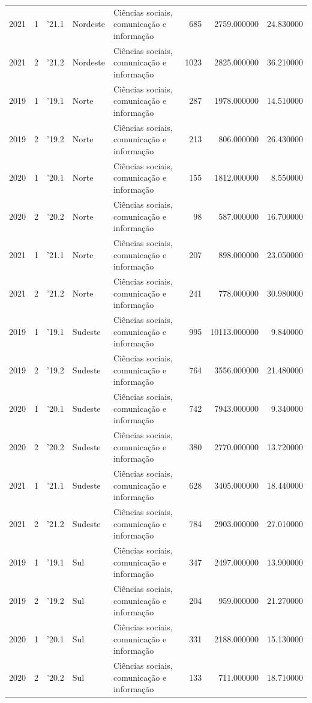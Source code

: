 \begin{longtable}{rrlllrrr}
2021 & 1 & '21.1 & Nordeste & Ciências sociais, comunicação e informação & 685 & 2759.000000 & 24.830000 \\
2021 & 2 & '21.2 & Nordeste & Ciências sociais, comunicação e informação & 1023 & 2825.000000 & 36.210000 \\
2019 & 1 & '19.1 & Norte & Ciências sociais, comunicação e informação & 287 & 1978.000000 & 14.510000 \\
2019 & 2 & '19.2 & Norte & Ciências sociais, comunicação e informação & 213 & 806.000000 & 26.430000 \\
2020 & 1 & '20.1 & Norte & Ciências sociais, comunicação e informação & 155 & 1812.000000 & 8.550000 \\
2020 & 2 & '20.2 & Norte & Ciências sociais, comunicação e informação & 98 & 587.000000 & 16.700000 \\
2021 & 1 & '21.1 & Norte & Ciências sociais, comunicação e informação & 207 & 898.000000 & 23.050000 \\
2021 & 2 & '21.2 & Norte & Ciências sociais, comunicação e informação & 241 & 778.000000 & 30.980000 \\
2019 & 1 & '19.1 & Sudeste & Ciências sociais, comunicação e informação & 995 & 10113.000000 & 9.840000 \\
2019 & 2 & '19.2 & Sudeste & Ciências sociais, comunicação e informação & 764 & 3556.000000 & 21.480000 \\
2020 & 1 & '20.1 & Sudeste & Ciências sociais, comunicação e informação & 742 & 7943.000000 & 9.340000 \\
2020 & 2 & '20.2 & Sudeste & Ciências sociais, comunicação e informação & 380 & 2770.000000 & 13.720000 \\
2021 & 1 & '21.1 & Sudeste & Ciências sociais, comunicação e informação & 628 & 3405.000000 & 18.440000 \\
2021 & 2 & '21.2 & Sudeste & Ciências sociais, comunicação e informação & 784 & 2903.000000 & 27.010000 \\
2019 & 1 & '19.1 & Sul & Ciências sociais, comunicação e informação & 347 & 2497.000000 & 13.900000 \\
2019 & 2 & '19.2 & Sul & Ciências sociais, comunicação e informação & 204 & 959.000000 & 21.270000 \\
2020 & 1 & '20.1 & Sul & Ciências sociais, comunicação e informação & 331 & 2188.000000 & 15.130000 \\
2020 & 2 & '20.2 & Sul & Ciências sociais, comunicação e informação & 133 & 711.000000 & 18.710000 \\

\end{longtable}
